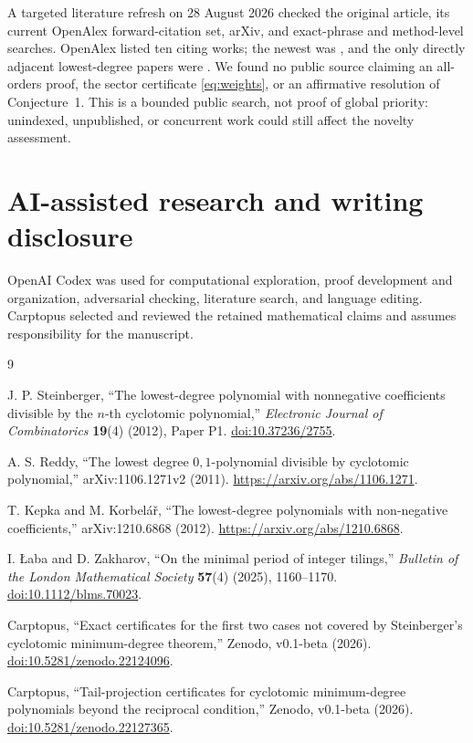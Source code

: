 \documentclass[11pt]{article}
\numberwithin{equation}{section}
\begin{document}
A targeted literature refresh on 28 August 2026 checked the original article,
its current OpenAlex forward-citation set, arXiv, and exact-phrase and
method-level searches. OpenAlex listed ten citing works; the newest was
\cite{laba2025}, and the only directly adjacent lowest-degree papers were
\cite{reddy2011,kepka2012}. We found no public source claiming an all-orders
proof, the sector certificate \eqref{eq:weights}, or an affirmative resolution
of Conjecture~1. This is a bounded public search, not proof of global priority:
unindexed, unpublished, or concurrent work could still affect the novelty
assessment.

\section{AI-assisted research and writing disclosure}

OpenAI Codex was used for computational exploration, proof development and
organization, adversarial checking, literature search, and language editing.
Carptopus selected and reviewed the retained mathematical claims and assumes
responsibility for the manuscript.

\begingroup
\small
\begin{thebibliography}{9}

J. P. Steinberger,
``The lowest-degree polynomial with nonnegative coefficients divisible by the
$n$-th cyclotomic polynomial,''
\emph{Electronic Journal of Combinatorics} \textbf{19}(4) (2012), Paper P1.
\href{https://doi.org/10.37236/2755}{doi:10.37236/2755}.

A. S. Reddy,
``The lowest degree $0,1$-polynomial divisible by cyclotomic polynomial,''
arXiv:1106.1271v2 (2011).
\url{https://arxiv.org/abs/1106.1271}.

T. Kepka and M. Korbel\'a\v{r},
``The lowest-degree polynomials with non-negative coefficients,''
arXiv:1210.6868 (2012).
\url{https://arxiv.org/abs/1210.6868}.

I. {\L}aba and D. Zakharov,
``On the minimal period of integer tilings,''
\emph{Bulletin of the London Mathematical Society} \textbf{57}(4) (2025),
1160--1170.
\href{https://doi.org/10.1112/blms.70023}{doi:10.1112/blms.70023}.

Carptopus,
``Exact certificates for the first two cases not covered by Steinberger's
cyclotomic minimum-degree theorem,'' Zenodo, v0.1-beta (2026).
\href{https://doi.org/10.5281/zenodo.22124096}{doi:10.5281/zenodo.22124096}.

Carptopus,
``Tail-projection certificates for cyclotomic minimum-degree polynomials beyond
the reciprocal condition,'' Zenodo, v0.1-beta (2026).
\href{https://doi.org/10.5281/zenodo.22127365}{doi:10.5281/zenodo.22127365}.

\end{thebibliography}
\endgroup
\end{document}
